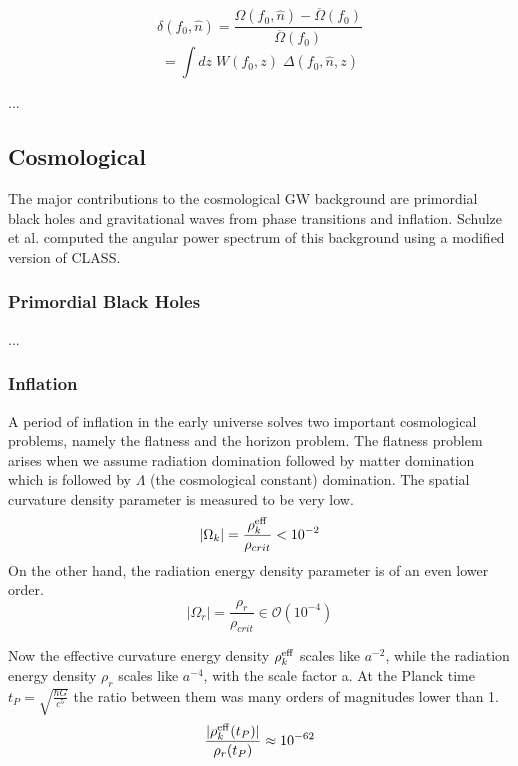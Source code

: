 \begin{equation}
    \delta(f_0, \hat{n}) = \frac{\Omega(f_0, \hat{n})-\overline{\Omega}(f_0)}{\overline{\Omega}(f_0)}
\end{equation}
\begin{equation}
    = \int dz \; W(f_0, z) \; \Delta(f_0, \hat{n}, z)
\end{equation}

...
\subsection{Cosmological}
The major contributions to the cosmological GW background are primordial
black holes and gravitational waves from phase transitions and inflation.
Schulze et al. \cite{schulze_gw_class_2023} computed the angular power spectrum 
of this background using a modified version of CLASS\cite{blas_cosmic_2011}.
\subsubsection{Primordial Black Holes}
...
\subsubsection{Inflation}

A period of inflation in the early universe solves two important cosmological problems, namely the flatness and the horizon problem. The flatness problem arises when we assume radiation domination followed by matter domination which is followed by $\Lambda$ (the cosmological constant) domination. The spatial curvature density parameter is measured to be very low. 
\begin{equation}
    |\Omega_k| = \frac{\rho_k^{\rm{eff}}}{\rho_{crit}} < 10^{-2}
\end{equation} 
On the other hand, the radiation energy density parameter is of an even lower order.
\begin{equation}
    |\Omega_r| = \frac{\rho_r}{\rho_{crit}} \in \mathcal{O}(10^{-4}) 
\end{equation}

Now the effective curvature energy density $\rho_{k}^{\rm{eff}}$ scales like $a^{-2}$, while the radiation energy density $\rho_{r}$ scales like $a^{-4}$, with the scale factor a.
At the Planck time $t_P = \sqrt{\frac{\hbar G}{c^5}}$ the ratio between them was many orders of magnitudes lower than 1.
\begin{equation}
    \frac{|\rho_k^{\rm{eff}}(t_P)|}{\rho_r(t_P)} \approx 10^{-62}
\end{equation}

